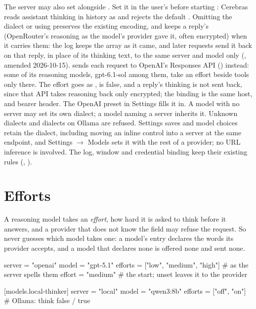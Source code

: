 The server may also set  alongside
. Set it in the user's 
before starting \nodwyn{}: Cerebras reads assistant thinking in history as
 and rejects the default .
Omitting the dialect or using  preserves the existing
encoding, and keeps a reply's  (OpenRouter's
reasoning as the model's provider gave it, often encrypted) when it carries
them: the log keeps the array as it came, and later requests send it back on
that reply, in place of its thinking text, to the same server and model only
(, amended 2026-10-15).  sends each
request to OpenAI's
Responses API () instead: some of its reasoning models,
gpt-6.1-sol among them, take an effort beside tools only there. The effort goes
as ,  is false, and a reply's thinking is
not sent back, since that API takes reasoning back only encrypted; the
binding is the same host,  and bearer header. The OpenAI preset in
Settings fills it in. A model with no server may set its own dialect; a model naming a
server inherits it. Unknown dialects and dialects on Ollama are refused.
Settings saves and model choices retain the dialect, including moving an
inline control into a server at the same endpoint, and Settings
$\to$ Models sets it with the rest of a provider; no URL inference is
involved. The log, window and credential binding keep their existing rules
(, ).

\section{Efforts}

A reasoning model takes an \emph{effort}, how hard it is asked to think
before it answers, and a provider that does not know the field may refuse the
request. So \nodwyn{} never guesses which model takes one: a model's entry
declares the words its provider accepts, and a model that declares none is
offered none and sent none.

\begin{toml}
server  = "openai"
model   = "gpt-5.1"
efforts = ["low", "medium", "high"]   # as the server spells them
effort  = "medium"                    # the start; unset leaves it to the provider

[models.local-thinker]
server  = "local"
model   = "qwen3:8b"
efforts = ["off", "on"]               # Ollama: think false / true
\end{toml}

